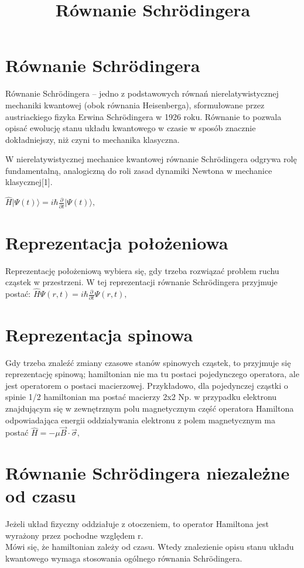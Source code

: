 \documentclass{article}
\begin{document}
\title{Równanie Schrödingera}
\maketitle

\section{Równanie Schrödingera}
Równanie Schrödingera – jedno z podstawowych równań nierelatywistycznej mechaniki kwantowej (obok równania Heisenberga), sformułowane przez austriackiego fizyka Erwina Schrödingera w 1926 roku. Równanie to pozwala opisać ewolucję stanu układu kwantowego w czasie w sposób znacznie dokładniejszy, niż czyni to mechanika klasyczna.

W nierelatywistycznej mechanice kwantowej równanie Schrödingera odgrywa rolę fundamentalną, analogiczną do roli zasad dynamiki Newtona w mechanice klasycznej[1]. 

${ {\hat {H}}{\big |}\Psi (t)\rangle =i\hbar {\frac {\partial }{\partial t}}{\big |}\Psi (t)\rangle ,}$


\section{Reprezentacja położeniowa}
Reprezentację położeniową wybiera się, gdy trzeba rozwiązać problem ruchu cząstek w przestrzeni. W tej reprezentacji równanie Schrödingera przyjmuje postać: 
${ {\hat {H}}\Psi (r,t)=i\hbar {\frac {\partial }{\partial t}}\Psi (r,t),}$

\section{Reprezentacja spinowa}
Gdy trzeba znaleźć zmiany czasowe stanów spinowych cząstek, to przyjmuje się reprezentację spinową; hamiltonian nie ma tu postaci pojedynczego operatora, ale jest operatorem o postaci macierzowej. Przykładowo, dla pojedynczej cząstki o spinie 1/2 hamiltonian ma postać macierzy 2x2
Np. w przypadku elektronu znajdującym się w zewnętrznym polu  magnetycznym część operatora Hamiltona odpowiadająca energii oddziaływania elektronu z polem magnetycznym ma postać 
\begin{math}
{ {\hat {H}}=-\mu {\vec {B}}\cdot {\vec {\sigma }},}
\end{math}

\section{Równanie Schrödingera niezależne od czasu}
Jeżeli układ fizyczny oddziałuje z otoczeniem, to operator Hamiltona jest wyrażony przez pochodne względem r.
\\Mówi się, że hamiltonian zależy od czasu. Wtedy znalezienie opisu stanu układu kwantowego wymaga stosowania ogólnego równania Schrödingera.
\end{document}
